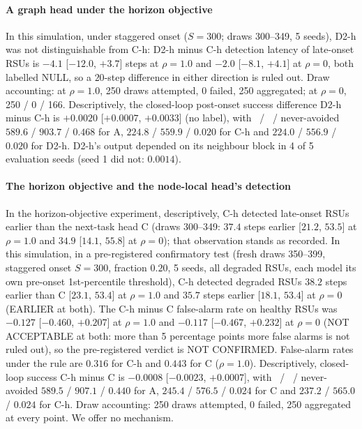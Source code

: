 

\paragraph*{A graph head under the horizon objective}
In this simulation, under staggered onset ($S=300$; draws 300--349, 5 seeds), D2-h was not distinguishable from C-h: D2-h minus C-h detection latency of late-onset RSUs is $-4.1$ [$-12.0$, $+3.7$] steps at $\rho=1.0$ and $-2.0$ [$-8.1$, $+4.1$] at $\rho=0$, both labelled NULL, so a $20$-step difference in either direction is ruled out.
Draw accounting: at $\rho=1.0$, 250 draws attempted, 0 failed, 250 aggregated; at $\rho=0$, 250 / 0 / 166.
Descriptively, the closed-loop post-onset success difference D2-h minus C-h is $+0.0020$ [$+0.0007$, $+0.0033$] (no label), with \nav\ / \nwin\ / never-avoided $589.6$ / $903.7$ / $0.468$ for A, $224.8$ / $559.9$ / $0.020$ for C-h and $224.0$ / $556.9$ / $0.020$ for D2-h.
D2-h's output depended on its neighbour block in 4 of 5 evaluation seeds (seed 1 did not: $0.0014$).
\latcaveat

\paragraph*{The horizon objective and the node-local head's detection}
In the horizon-objective experiment, descriptively, C-h detected late-onset RSUs earlier than the next-task head C (draws 300--349: $37.4$ steps earlier [$21.2$, $53.5$] at $\rho=1.0$ and $34.9$ [$14.1$, $55.8$] at $\rho=0$); that observation stands as recorded.
In this simulation, in a pre-registered confirmatory test (fresh draws 350--399, staggered onset $S=300$, fraction $0.20$, 5 seeds, all degraded RSUs, each model its own pre-onset 1st-percentile threshold), C-h detected degraded RSUs $38.2$ steps earlier than C [$23.1$, $53.4$] at $\rho=1.0$ and $35.7$ steps earlier [$18.1$, $53.4$] at $\rho=0$ (EARLIER at both).
The C-h minus C false-alarm rate on healthy RSUs was $-0.127$ [$-0.460$, $+0.207$] at $\rho=1.0$ and $-0.117$ [$-0.467$, $+0.232$] at $\rho=0$ (NOT ACCEPTABLE at both: more than 5 percentage points more false alarms is not ruled out), so the pre-registered verdict is NOT CONFIRMED.
False-alarm rates under the rule are $0.316$ for C-h and $0.443$ for C ($\rho=1.0$).
Descriptively, closed-loop success C-h minus C is $-0.0008$ [$-0.0023$, $+0.0007$], with \nav\ / \nwin\ / never-avoided $589.5$ / $907.1$ / $0.440$ for A, $245.4$ / $576.5$ / $0.024$ for C and $237.2$ / $565.0$ / $0.024$ for C-h.
Draw accounting: 250 draws attempted, 0 failed, 250 aggregated at every point.
We offer no mechanism.
\latcaveat

